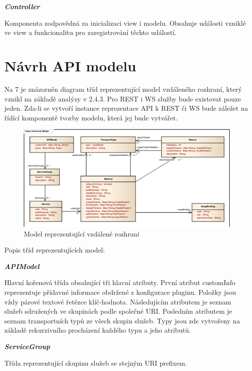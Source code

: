 \documentclass[11pt,twoside,a4paper]{book}
\begin{document}
\textbf{\textit{Controller}}

Komponenta zodpovědná za inicializaci view i modelu. Obsahuje události vzniklé ve view a
funkcionalitu pro zaregistrování těchto událostí.

\section{Návrh API modelu}

Na 7 je znázorněn diagram tříd reprezentující model vzdáleného rozhraní, který vznikl na
základě analýzy v 2.4.3. Pro REST i WS služby bude existovat pouze jeden. Zda-li se vytvoří
instance reprezentace API k REST či WS bude záležet na řídící komponentě tvorby modelu,
která jej bude vytvářet.

\begin{figure}[h]
\begin{center}
\includegraphics[width=13cm]{images-pdf/Universal-Model.pdf}
\caption{Model reprezentující vzdálené rozhraní}
\label{fig:logo}
\end{center}
\end{figure}

Popis tříd reprezentujících model:

\textbf{\textit{APIModel}}

Hlavní kořenová třída obsahující tři hlavní atributy. První atribut customInfo reprezentuje
přídavné informace obdržené z konfigurace pluginu. Položky jsou vždy párové textové
řetězce klíč-hodnota. Následujícím atributem je seznam služeb sdružených ve skupinách
podle společné URI. Posledním atributem je seznam transportních typů ze všech skupin
služeb. Typy jsou zde vytvořeny na základě rekurzivního procházení každého typu a jeho
atributů.

\textbf{\textit{ServiceGroup}}

Třída reprezentující skupinu služeb se stejným URI prefixem.
\end{document}
